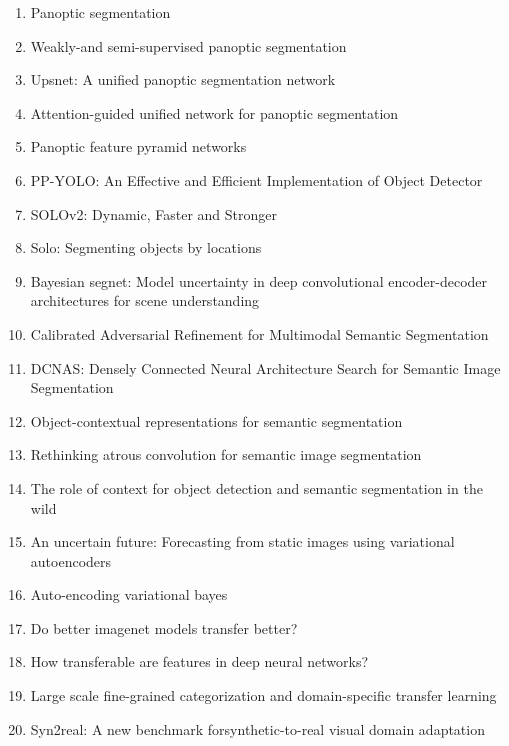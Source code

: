 \documentclass[acmlarge]{acmart}
\begin{document}
\begin{enumerate}
	\item Panoptic segmentation \cite{kirillov2019panoptic}
	\item Weakly-and semi-supervised panoptic segmentation \cite{li2018weakly}
	\item Upsnet: A unified panoptic segmentation network \cite{xiong2019upsnet}
	\item Attention-guided unified network for panoptic segmentation \cite{li2019attention}
	\item Panoptic feature pyramid networks \cite{kirillov2019panoptic}
	\item PP-YOLO: An Effective and Efficient Implementation of Object Detector \cite{long2020pp}
	\item SOLOv2: Dynamic, Faster and Stronger \cite{wang2020solov2}
	\item Solo: Segmenting objects by locations \cite{wang2019solo}
	\item Bayesian segnet: Model uncertainty in deep convolutional encoder-decoder architectures for scene understanding \cite{kendall2015bayesian}
	\item Calibrated Adversarial Refinement for Multimodal Semantic Segmentation \cite{kassapis2020calibrated}
	\item DCNAS: Densely Connected Neural Architecture Search for Semantic Image Segmentation \cite{zhang2020dcnas}
	\item Object-contextual representations for semantic segmentation \cite{yuan2019object}
	\item Rethinking atrous convolution for semantic image segmentation \cite{chen2017rethinking}
	\item The role of context for object detection and semantic segmentation in the wild \cite{mottaghi2014role}
	\item An uncertain future: Forecasting from static images using variational autoencoders \cite{walker2016uncertain}
	\item Auto-encoding variational bayes \cite{kingma2013auto}
	\item Do better imagenet models transfer better? \cite{kornblith2019better}
	\item How transferable are features in deep neural networks? \cite{yosinski2014transferable}
	\item Large scale fine-grained categorization and domain-specific transfer learning \cite{cui2018large}
	\item Syn2real: A new benchmark forsynthetic-to-real visual domain adaptation \cite{peng2018syn2real}

\end{enumerate}
\end{document}
